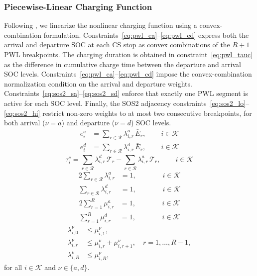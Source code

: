 \subsubsection{Piecewise-Linear Charging Function}
Following \citet{montoya_electric_2017}, we linearize the nonlinear charging function using a convex-combination formulation. Constraints~\eqref{eq:pwl_ea}--\eqref{eq:pwl_ed} express both the arrival and departure SOC at each CS stop as convex combinations of the $R+1$ PWL breakpoints. The charging duration is obtained in constraint~\eqref{eq:pwl_tauc} as the difference in cumulative charge time between the departure and arrival SOC levels. Constraints~\eqref{eq:pwl_ca}--\eqref{eq:pwl_cd} impose the convex-combination normalization condition on the arrival and departure weights. Constraints~\eqref{eq:sos2_sa}--\eqref{eq:sos2_sd} enforce that exactly one PWL segment is active for each SOC level. Finally, the SOS2 adjacency constraints~\eqref{eq:sos2_lo}--\eqref{eq:sos2_hi} restrict non-zero weights to at most two consecutive breakpoints, for both arrival ($\nu=a$) and departure ($\nu=d$) SOC levels.
\begin{align}
    e_i^a &= \sum_{r \in \mathcal{R}} \lambda_{i,r}^{a}\,\bar{E}_r, \qquad \, i \in \mathcal{K} \label{eq:pwl_ea}\\
    e_i^d &= \sum_{r \in \mathcal{R}} \lambda_{i,r}^{d}\,\bar{E}_r, \qquad \, i \in \mathcal{K} \label{eq:pwl_ed}
\end{align}
\begin{equation}
    \tau_i^c = \sum_{r \in \mathcal{R}} \lambda_{i,r}^{d}\,\mathcal{T}_r - \sum_{r \in \mathcal{R}} \lambda_{i,r}^{a}\,\mathcal{T}_r, \qquad \, i \in \mathcal{K} \label{eq:pwl_tauc}
\end{equation}
\begin{alignat}{2}
    \sum_{r \in \mathcal{R}} \lambda_{i,r}^{a} &= 1, &\qquad& \, i \in \mathcal{K} \label{eq:pwl_ca}\\
    \sum_{r \in \mathcal{R}} \lambda_{i,r}^{d} &= 1, &\qquad& \, i \in \mathcal{K} \label{eq:pwl_cd}
\end{alignat}
\begin{alignat}{2}
    \sum_{r=1}^{R} \mu_{i,r}^{a} &= 1, &\qquad& \, i \in \mathcal{K} \label{eq:sos2_sa}\\
    \sum_{r=1}^{R} \mu_{i,r}^{d} &= 1, &\qquad& \, i \in \mathcal{K} \label{eq:sos2_sd}
\end{alignat}
\begin{align}
    \lambda_{i,0}^{\nu}   &\leq \mu_{i,1}^{\nu}, \label{eq:sos2_lo}\\
    \lambda_{i,r}^{\nu}   &\leq \mu_{i,r}^{\nu} + \mu_{i,r+1}^{\nu}, \quad r = 1,\ldots,R-1, \label{eq:sos2_mid}\\
    \lambda_{i,R}^{\nu}   &\leq \mu_{i,R}^{\nu}, \label{eq:sos2_hi}
\end{align}
for all $i\in\mathcal{K}$ and $\nu\in\{a,d\}$.

